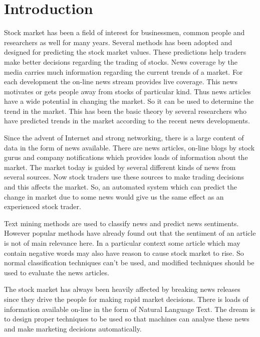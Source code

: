 \documentclass[a4paper,12bp]{report}
\begin{document}
\tableofcontents
\newpage
\listoffigures
\newpage
\listoftables

\doublespacing
\newpage
{}
\chapter{Introduction}
\label{chap:introduction}
\thispagestyle{empty}

Stock market has been a field of interest for businessmen, common people and researchers as well for many years. Several methods has been adopted and designed for predicting the stock market values. These predictions help traders make better decisions regarding the trading of stocks. News coverage by the media carries much information regarding the current trends of a market. For each development the on-line news stream provides live coverage. This news motivates or gets people away from stocks of particular kind. Thus news articles have a wide potential in changing the market. So it can be used to determine the trend in the market. This has been the basic theory by several researchers who have predicted trends in the market according to the recent news developments.

Since the advent of Internet and strong networking, there is a large content of data in the form of news available. There are news articles, on-line blogs by stock gurus and company notifications which provides loads of information about the market. The market today is guided by several different kinds of news from several sources. Now stock traders use these sources to make trading decisions and this affects the market. So, an automated system which can predict the change in market due to some news would give us the same effect as an experienced stock trader.

Text mining methods are used to classify news and predict news sentiments. However popular methods have already found out that the sentiment of an article is not of main relevance here. In a particular context some article which may contain negative words may also have reason to cause stock market to rise. So normal classification techniques can't be used, and modified techniques should be used to evaluate the news articles.

The stock market has always been heavily affected by breaking news releases since they drive the people for making rapid market decisions. There is loads of information available on-line in the form of Natural Language Text. The dream is to design proper techniques to be used so that machines can analyse these news and make marketing decisions automatically.
\end{document}
